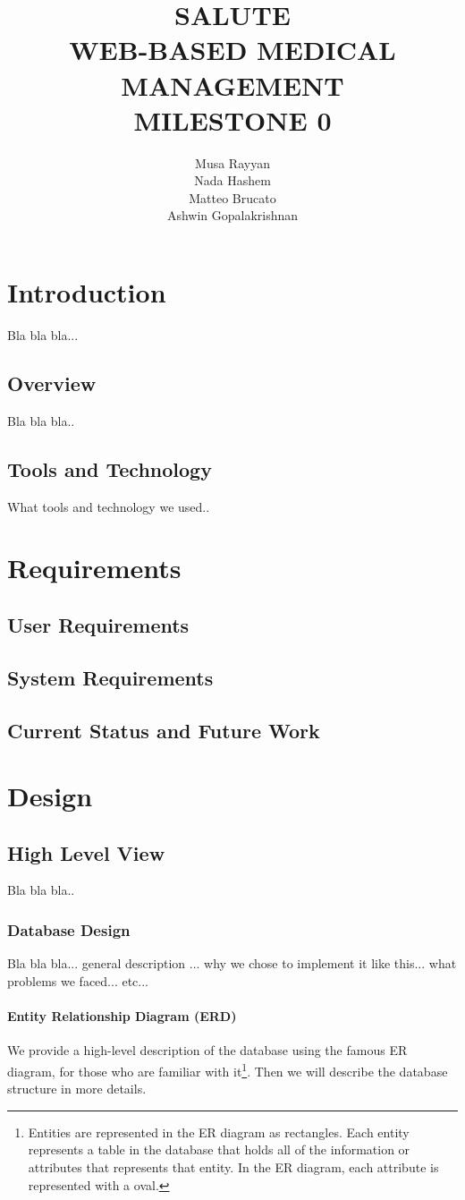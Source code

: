 \documentclass[12pt]{report}
\title{SALUTE \\ WEB-BASED MEDICAL MANAGEMENT \\ MILESTONE 0}
\author{Musa Rayyan \\ Nada Hashem \\ Matteo Brucato \\ Ashwin Gopalakrishnan}
\begin{document}
\maketitle
\tableofcontents


\part{Introduction}
Bla bla bla...
\chapter{Overview}
Bla bla bla..
\chapter{Tools and Technology}
What tools and technology we used..


\part{Requirements}
\chapter{User Requirements}
\chapter{System Requirements}
\chapter{Current Status and Future Work}


\part{Design}

\chapter{High Level View}
Bla bla bla..

\section{Database Design}
Bla bla bla... general description ... why we chose to implement it like this... what problems we faced... etc...

\subsection{Entity Relationship Diagram (ERD)}
We provide a high-level description of the database using the famous ER diagram, for those who are familiar with it\footnote{Entities are represented in the ER diagram as rectangles.  Each entity represents a table in the database that holds all of the information or attributes that represents that entity.  In the ER diagram, each attribute is represented with a oval.}. Then we will describe the database structure in more details.
\end{document}

